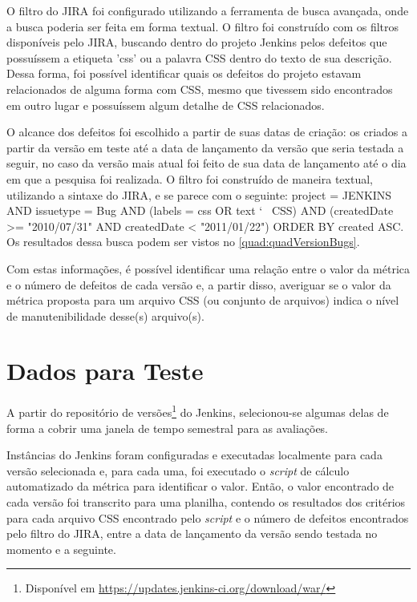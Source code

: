 O filtro do JIRA foi configurado utilizando a ferramenta de busca avançada, onde a busca poderia ser feita em forma textual. O filtro foi construído com os filtros disponíveis pelo JIRA, buscando dentro do projeto Jenkins pelos defeitos que possuíssem a etiqueta 'css' ou a palavra CSS dentro do texto de sua descrição. Dessa forma, foi possível identificar quais os defeitos do projeto estavam relacionados de alguma forma com CSS, mesmo que tivessem sido encontrados em outro lugar e possuíssem algum detalhe de CSS relacionados.

O alcance dos defeitos foi escolhido a partir de suas datas de criação: os criados a partir da versão em teste até a data de lançamento da versão que seria testada a seguir, no caso da versão mais atual foi feito de sua data de lançamento até o dia em que a pesquisa foi realizada. O filtro foi construído de maneira textual, utilizando a sintaxe do JIRA, e se parece com o seguinte: project = JENKINS AND issuetype = Bug AND (labels = css OR text \char`~ CSS) AND (createdDate >= "2010/07/31" AND createdDate < "2011/01/22") ORDER BY created ASC. Os resultados dessa busca podem ser vistos no \autoref{quad:quadVersionBugs}.

Com estas informações, é possível identificar uma relação entre o valor da métrica e o número de defeitos de cada versão e, a partir disso, averiguar se o valor da métrica proposta para um arquivo CSS (ou conjunto de arquivos) indica o nível de manutenibilidade desse(s) arquivo(s).

\section{Dados para Teste}

A partir do repositório de versões\footnote{Disponível em \url{https://updates.jenkins-ci.org/download/war/}} do Jenkins, selecionou-se algumas delas de forma a cobrir uma janela de tempo semestral para as avaliações.

Instâncias do Jenkins foram configuradas e executadas localmente para cada versão selecionada e, para cada uma, foi executado o \textit{script} de cálculo automatizado da métrica para identificar o valor. Então, o valor encontrado de cada versão foi transcrito para uma planilha, contendo os resultados dos critérios para cada arquivo CSS encontrado pelo \textit{script} e o número de defeitos encontrados pelo filtro do JIRA, entre a data de lançamento da versão sendo testada no momento e a seguinte.


